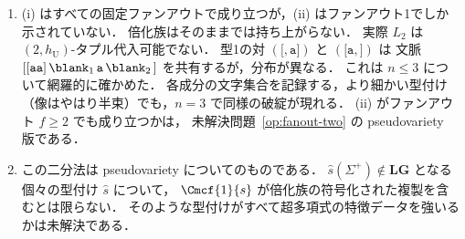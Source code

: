 \begin{remark}[二分法の適用範囲]
\label{rem:dichotomy-scope}
\begin{enumerate}[label=\textup{(\roman*)},leftmargin=*]
\item (i) はすべての固定ファンアウトで成り立つが，(ii) はファンアウト1でしか示されていない．
倍化族はそのままでは持ち上がらない．
実際 $L_2$ は $(2,h_{\mathrm U})$-タプル代入可能でない．
型1の対 $(\mathtt[,\mathtt a\mathtt])$ と $(\mathtt[\mathtt a,\mathtt])$ は
文脈 $\mathtt{[[aa]}\,\blank_1\,\mathtt a\,\blank_2\,\mathtt]$ を共有するが，分布が異なる．
これは $n\le3$ について網羅的に確かめた．
各成分の文字集合を記録する，より細かい型付け（像はやはり半束）でも，$n=3$ で同様の破綻が現れる．
(ii) がファンアウト $f\ge2$ でも成り立つかは，
未解決問題~\ref{op:fanout-two} の pseudovariety 版である．
\item この二分法は pseudovariety についてのものである．
$\widehat{s}(\Sigma^+)\notin\mathbf{LG}$ となる個々の型付け $\widehat{s}$ について，
$\Cmcf{1}{s}$ が倍化族の符号化された複製を含むとは限らない．
そのような型付けがすべて超多項式の特徴データを強いるかは未解決である．
\end{enumerate}
\end{remark}

